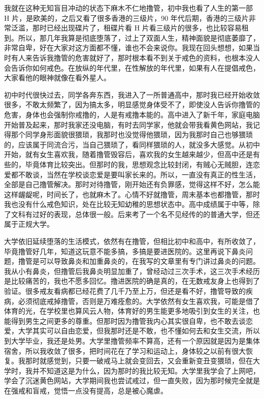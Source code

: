 我就在这种无知盲目冲动的状态下麻木不仁地撸管，初中我也看了人生的第一部 H 片，是欧美的，之后又看了很多香港的三级片，90 年代后期，香港的三级片非常泛滥，那时已经出现碟片了，租碟片看 H 片看三级片的很多，也比较容易租到。所以，那几年我算是彻底堕落了，过上了双面人生，精神面貌是彻底萎靡了，非常自卑，好在大家对这方面都不懂，谁也不会来说你。我现在回头想想，如果当时有人来告诉我撸管的危害就好了，那时根本看不到关于戒色的资料，也根本没人会告诉你如何戒色。在放纵的年代里，在性解放的年代里，如果有人在提倡戒色，大家看他的眼神就像在看外星人。

初中时代很快过去，同学各奔东西，我进入了一所普通高中，那时我已经开始收敛很多，不敢太频繁了，因为搞太多，明显感觉身体受不了，即使没人告诉你撸管的危害，身体也会强制你戒撸的，人是有戒撸本能的。高中进入了新千年，家庭电脑开始普及起来，那时我家还没电脑，有时去同学家，他就会带我看黄色网站，我记得那个同学身形面貌很猥琐，我那时也没觉得他猥琐，因为我那时自己也够猥琐的，应该属于同流合污，当自己猥琐了，看同样猥琐的人，就没多大感觉。从初中开始，就有女生喜欢我，随着撸管毁容后，喜欢我的女生越来越少，但高中还是有些的，毕竟体育比较突出。但那时的我，思想观念比较封闭，有贼心无贼胆，连恋爱都不敢谈，当然在学校谈恋爱是要叫家长来的。所以，一直没有真正的性生活，全部是自己撸管解决。那时对待撸管，刚开始还有负罪感，觉得这样不好，怎么能这样龌龊呢，时间长了，也就麻木了。心情不好就撸管，周末基本也都撸管，那时我也没有什么戒色知识，处在比较无知幼稚的思想状态中。高中成绩属于中等，除了文科有过好的表现，总体很一般。后来考了一个名不见经传的的普通大学，但还属于正规大学。

大学依旧延续堕落的生活模式，依然有在撸管，但相比初中和高中，有所收敛了，毕竟撸管好几年，知道这玩意不能多搞，多搞是要进医院的。这里再说下鼻炎问题，撸管是可以导致鼻炎和加重鼻炎的，在我写的文章里有专门讲过鼻炎的问题。我从小有鼻炎，但撸管后我鼻炎明显加重了，曾经动过三次手术，这三次手术经历是比较痛苦的，我也不愿多回忆。撸进医院的确是真的，在无数戒友身上也得到了验证。很多戒友看病都已经花费了几千乃至上万，但还是看不好，撸管导致的疾病，必须彻底戒掉撸管，否则是万难痊愈的。大学依然有女生喜欢我，可能是借了体育的光，在学校里也算风云人物，体育好的男生能更多地吸引到女生的关注，也能得到男生之间更多的尊重。但那时因为撸管我内心其实很自卑，也不敢去谈恋爱，大学其实可以自由恋爱，但我那时还是不敢，也不懂如何去和女生交流，所以到大学毕业，我还是处男。大学里撸管频率不算高，还有一个原因就是因为是集体宿舍，所以我收敛了很多，把时间花在了学习和运动上，身体较之以前有很大恢复。我那时就感觉到，只要一破戒马上就会变回去，又会重新变丑变猥琐，但在大学时，我并不知道这是为什么，因为那时的我比较无知。大学里我学会了上网吧，学会了沉迷黄色网站，大学期间我也尝试戒过，但一直失败，因为那时候完全就是在强戒和盲戒，觉悟一点没有提高，总是被心魔虐。

